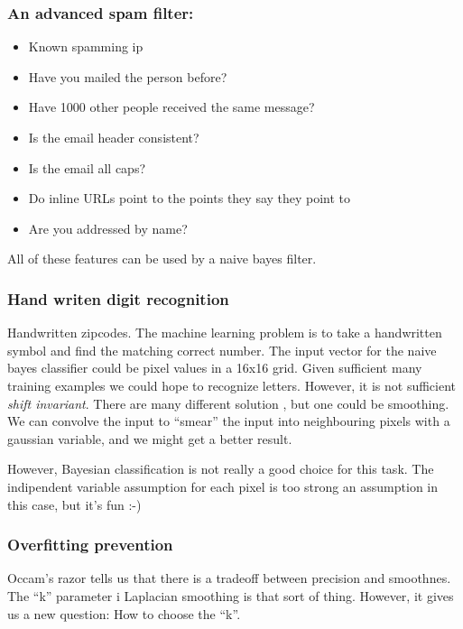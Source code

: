 \documentclass[a4, 12pt, english, USenglish]{scrreprt}
\newcommand{\idx}[1]{{\em #1}\index{#1}}
\begin{document}
\subsubsection{An advanced spam filter:}

\begin{itemize}
\item    Known spamming ip
\item   Have you mailed the person before?
\item   Have 1000 other people received the same message?
\item   Is the email header consistent?
\item   Is the email all caps?
\item   Do inline URLs point to the points they say they point to 
\item   Are you addressed by name?
\end{itemize}

All of these features can be used by a  naive bayes filter.

\subsubsection{Hand writen digit recognition}

Handwritten zipcodes. The machine learning problem is to take a
handwritten symbol and find the matching correct number.   The input
vector for the naive bayes classifier could be pixel values in a 16x16
grid.   Given sufficient many training examples we could hope to
recognize letters.  However, it is not sufficient \idx{shift
  invariant}.  There are many different solution , but one could be
smoothing.  We can convolve the input to ``smear'' the input into
neighbouring pixels with a gaussian variable, and we might get a
better result.

However, Bayesian classification is not really a good choice for this
task.  The indipendent variable assumption for each pixel is too
strong an assumption in this case, but it's fun :-)


\subsubsection{Overfitting prevention}

Occam's razor tells us that there is a tradeoff between precision and
smoothnes.  The ``k'' parameter i Laplacian smoothing is that sort of
thing.  However, it gives us a new question: How to choose the ``k''.   
\end{document}
